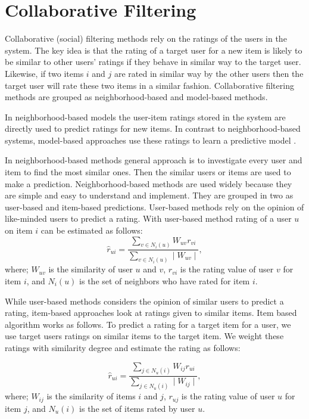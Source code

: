 \documentclass[conference]{IEEEtran}
\begin{document}
\section{Collaborative Filtering}
\label{sec:cf}

Collaborative (social) filtering methods rely on the ratings of the users in the 
system. The key idea is that the rating of a target user for a new item is likely 
to be similar to other users' ratings if they behave in similar way to the target 
user. Likewise, if two items $i$ and $j$ are rated in similar way by the other users 
then the target user will rate these two items in a similar fashion. Collaborative 
filtering methods are grouped as neighborhood-based and model-based methods. 

In  neighborhood-based models the user-item ratings stored in the system are
directly used to predict ratings for new items. In contrast to neighborhood-based 
systems, model-based approaches use these ratings to learn a predictive model 
\cite{DBLP:journals/ir/HerlockerKR02}.

In neighborhood-based methods general approach is to investigate every user and 
item to find the most similar ones. Then the similar users or items are used to 
make a prediction. Neighborhood-based methods are used widely because they are 
simple and easy to understand and implement. They are grouped in two as user-based 
and item-based predictions. User-based methods rely on the opinion of like-minded 
users to predict a rating. With user-based method rating of a user $u$ on item $i$ 
can be estimated as follows:
\[
\hat{r}_{ui} = \frac{\sum\limits_{v \in N_i(u)} W_{uv}r_{vi}}{\sum\limits_{v \in N_i(u)} \mid W_{uv} \mid},
\]
where; $W_{uv}$ is the similarity of user $u$ and $v$, $r_{vi}$ is the rating value 
of user $v$ for item $i$, and $N_i(u)$ is the set of neighbors who have rated for  
item $i$.

While user-based methods considers the opinion of similar users to predict a rating, 
item-based approaches look at ratings given to similar items. Item based algorithm 
works as follows. To predict a rating for a target item for a user, we use target users
ratings on similar items to the target item. We weight these ratings with similarity 
degree and estimate the rating as follows:

\[
\hat{r}_{ui} = \frac{\sum\limits_{j \in N_u(i)} W_{ij}r_{ui}}{\sum\limits_{j \in N_u(i)} \mid W_{ij} \mid},
\]
where; $W_{ij}$ is the similarity of items $i$ and $j$, $r_{uj}$ is the rating value 
of user $u$ for item $j$, and $N_u(i)$ is the set of items rated by user $u$.
\end{document}
